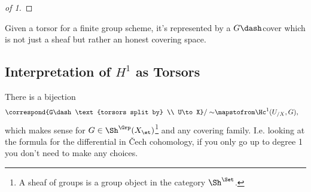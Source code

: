 \begin{example}[?]
\begin{proof}[of 1]
\end{proof}

\end{example}

\begin{remark}

Given a torsor for a finite group scheme, it's represented by a
\(G\dash\)cover which is not just a sheaf but rather an honest covering
space.

\end{remark}

\hypertarget{interpretation-of-h1-as-torsors}{%
\subsection{\texorpdfstring{Interpretation of \(H^1\) as
Torsors}{Interpretation of H\^{}1 as Torsors}}\label{interpretation-of-h1-as-torsors}}

\begin{proposition}[Interpretation of $H^1$]

There is a bijection
\begin{align*}  
\correspond{G\dash\text{torsors split by} \\ U\to X} / \sim
&\mapstofrom
\Hc^1(U_{/X}, G)
,\end{align*} which makes sense for \(G\in \Sh^\Grp(X_\et)\)\footnote{A
  sheaf of groups is a group object in the category \(\Sh^\Set\).} and
any covering family. I.e. looking at the formula for the differential in
Čech cohomology, if you only go up to degree 1 you don't need to make
any choices.

\end{proposition}

